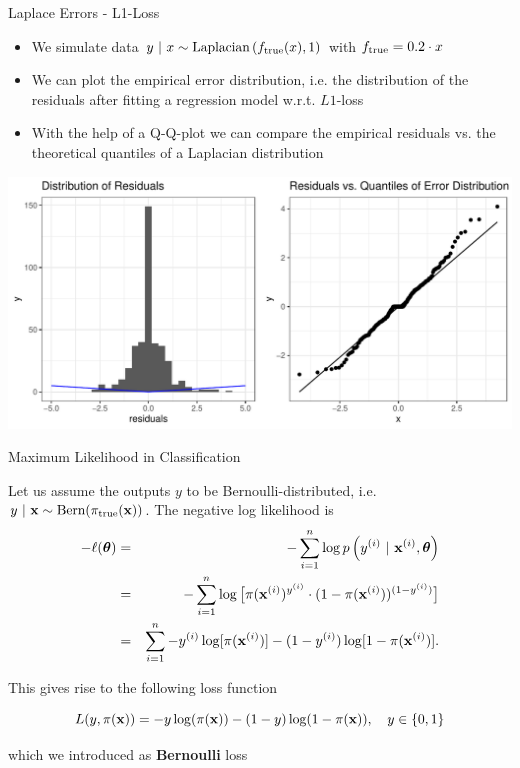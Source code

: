\documentclass[11pt,compress,t,notes=noshow, xcolor=table]{beamer}
\begin{document}
\begin{vbframe}{Laplace Errors - L1-Loss}
\framebreak 

\begin{footnotesize}
\begin{itemize}
	\item We simulate data $y ~|~x \sim \text{Laplacian}\left(f_{\text{true}}(x), 1\right)$ with $f_{\text{true}} = 0.2 \cdot x$
\item We can plot the empirical error distribution, i.e. the distribution of the residuals after fitting a regression model w.r.t. $L1$-loss
\item With the help of a Q-Q-plot we can compare the empirical residuals vs. the theoretical quantiles of a Laplacian distribution  
\end{itemize}
\end{footnotesize}
\includegraphics{figure/residuals_plot_L1.pdf}



\end{vbframe}



\begin{vbframe}{Maximum Likelihood in Classification}

Let us assume the outputs $y$ to be Bernoulli-distributed, i.e. $y ~|~ \mathbf{x} \sim \text{Bern}(\pi_\text{true}(\mathbf{x}))$. 
The negative log likelihood is
\begin{eqnarray*}
- \ell(\bm{\theta}) &=& -\sum\limits_{i=1}^n \log p\left(y^{(i)} ~|~\mathbf{x}^{(i)}, \bm{\theta}\right) \\ 
&=& - \sum\limits_{i=1}^n \log \big[\pi(\mathbf{x}^{(i)})^{y^{(i)}} \cdot (1 - \pi(\mathbf{x}^{(i)}))^{(1 - y^{(i)})} \big]\\
&=& \sum\limits_{i=1}^n -y^{(i)} \log[\pi(\mathbf{x}^{(i)})] - (1-y^{(i)}) \log [1 - \pi(\mathbf{x}^{(i)})]. 
\end{eqnarray*}



This gives rise to the following loss function 

$$
  L(y, \pi(\mathbf{x})) = -y\log(\pi(\mathbf{x}))-(1-y)\log(1-\pi(\mathbf{x})), \quad y \in \{0, 1\}
$$

which we introduced as \textbf{Bernoulli} loss 



\end{vbframe}
\end{document}
